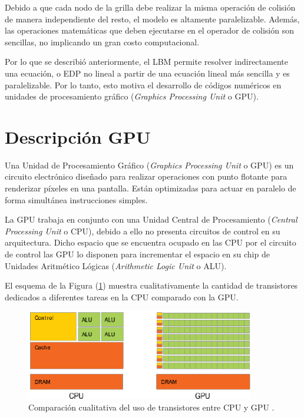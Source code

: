 Debido a que cada nodo de la grilla debe realizar la misma operación de colisión de manera independiente del resto, el modelo es altamente paralelizable. Además, las operaciones matemáticas que deben ejecutarse en el operador de colisión son sencillas, no implicando un gran costo computacional.

Por lo que se describió anteriormente, el LBM permite resolver indirectamente una ecuación, o EDP no lineal a partir de una ecuación lineal más sencilla y es paralelizable. Por lo tanto, esto motiva el desarrollo de códigos numéricos en unidades de procesamiento gráfico (\textit{Graphics Processing Unit} o GPU).
\newpage
\section{Descripción GPU}

Una Unidad de Procesamiento Gráfico (\textit{Graphics Processing Unit} o GPU) es un  circuito electrónico diseñado para realizar operaciones con punto flotante para renderizar píxeles en una pantalla. Están optimizadas para actuar en paralelo de forma simultánea instrucciones simples.

La GPU trabaja en conjunto con una Unidad Central de Procesamiento (\textit{Central Processing Unit} o CPU), debido a ello no presenta circuitos de control en su arquitectura. Dicho espacio que se encuentra ocupado en las CPU por el circuito de control las GPU lo disponen para incrementar el espacio en su chip de Unidades Aritmético Lógicas (\textit{Arithmetic Logic Unit} o ALU).

El esquema de la Figura (\ref{fig:cpu_gpu_transis}) muestra cualitativamente la cantidad de transistores dedicados a diferentes tareas en la CPU comparado con la GPU.

\begin{figure}[h!]
	\centering
	\includegraphics[width=10cm]{cpu_gpu.png}
	\caption{Comparación cualitativa del uso de transistores entre CPU y GPU \cite{rinaldi2011modelos}.}
	\label{fig:cpu_gpu_transis}
\end{figure}

